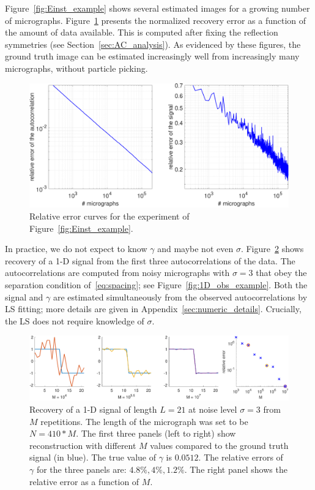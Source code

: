 \documentclass[12pt]{article}
\newcommand{\1}{\mathbf{1}}
\theoremstyle{plain}
\theoremstyle{definition}
\theoremstyle{remark}
\theoremstyle{plain}
\theoremstyle{remark}
\theoremstyle{plain}
\theoremstyle{plain}
\begin{document}
Figure~\ref{fig:Einst_example} shows several estimated images for a growing number of micrographs. %
Figure~\ref{fig:error_per_micro} %
presents the normalized recovery error as a function of the amount of data available.  This is computed after fixing the reflection symmetries (see Section~\ref{sec:AC_analysis}). As evidenced by these figures, the ground truth image can be estimated increasingly well from increasingly many micrographs, without particle picking.


\begin{figure}[h]
	\centering
	\includegraphics[width=.8\linewidth]{Einstein_recovery_error_combined}
	\caption{\label{fig:error_per_micro}Relative error curves for the experiment of Figure~\ref{fig:Einst_example}.}
\end{figure}


In practice, we do not expect to know $\gamma$ and maybe not even $\sigma$.
Figure~\ref{fig:1D_example} %
shows recovery of a 1-D signal from the first three autocorrelations of the data.
The autocorrelations are computed from noisy micrographs with $\sigma=3$ that obey the separation condition of~\eqref{eq:spacing}; see Figure~\ref{fig:1D_obs_example}.  
Both the signal  and $\gamma$ are estimated simultaneously from the observed autocorrelations by LS fitting; more details are given in Appendix~\ref{sec:numeric_details}. Crucially, the LS does not require  knowledge of $\sigma$. 


\begin{figure}[h]
	\centering
	\includegraphics[width=\linewidth]{1D_example}
	\caption{\label{fig:1D_example} Recovery of a 1-D signal of length $L=21$ at noise level $\sigma = 3$ from $M$ repetitions. The length of the micrograph was set to be $N = 410*M$. The first three panels (left to right) show reconstruction with different $M$ values compared to the ground truth signal (in blue).
		The true value of $\gamma$ is $0.0512$.
		The relative errors of $\gamma$ for the three panels are: $4.8\%,4\%,1.2\%$. The right panel shows the relative error as a function of $M$. 
	}
\end{figure}
\end{document}
